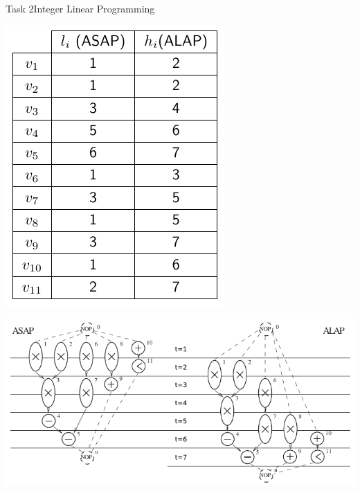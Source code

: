 \begin{frame}[allowframebreaks]{Task 2}{Integer Linear Programming}
  \begin{solution}
    \centering
    \includegraphics[height=0.6\paperheight]{./figures/task2_earliest_and_latest_starting_times.png}
  \end{solution}
  \begin{solutionnoinc}
    \includegraphics[width=\textwidth]{./figures/task2_scheduling_with_asap_and_alap.png}
  \end{solutionnoinc}
\end{frame}
